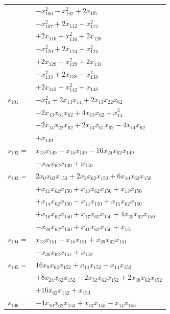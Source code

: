 \begin{longtable}{@{}r@{\;}l@{}}
 & \(\displaystyle -x_{100}^{2} -x_{102}^{2} +2x_{107}\) \\
 & \(\displaystyle -x_{107}^{2} +2x_{112} -x_{112}^{2}\) \\
 & \(\displaystyle +2x_{116} -x_{116}^{2} +2x_{120}\) \\
 & \(\displaystyle -x_{120}^{2} +2x_{124} -x_{124}^{2}\) \\
 & \(\displaystyle +2x_{129} -x_{129}^{2} +2x_{133}\) \\
 & \(\displaystyle -x_{133}^{2} +2x_{138} -x_{138}^{2}\) \\
 & \(\displaystyle +2x_{142} -x_{142}^{2} +x_{148}\) \\[3pt]
\(s_{101}=\) & \(\displaystyle -x_{13}^{2} +2x_{13}x_{14} +2x_{13}x_{22}x_{62}\) \\
 & \(\displaystyle -2x_{13}x_{61}x_{62} +4x_{13}x_{62} -x_{14}^{2}\) \\
 & \(\displaystyle -2x_{14}x_{22}x_{62} +2x_{14}x_{61}x_{62} -4x_{14}x_{62}\) \\
 & \(\displaystyle +x_{149}\) \\[3pt]
\(s_{102}=\) & \(\displaystyle x_{13}x_{149} -x_{14}x_{149} -16x_{24}x_{62}x_{149}\) \\
 & \(\displaystyle -x_{26}x_{62}x_{149} +x_{150}\) \\[3pt]
\(s_{103}=\) & \(\displaystyle 2x_{0}x_{62}x_{150} +2x_{2}x_{62}x_{150} +6x_{10}x_{62}x_{150}\) \\
 & \(\displaystyle +x_{11}x_{62}x_{150} +x_{13}x_{62}x_{150} +x_{13}x_{150}\) \\
 & \(\displaystyle +x_{14}x_{62}x_{150} -x_{14}x_{150} +x_{15}x_{62}x_{150}\) \\
 & \(\displaystyle +x_{16}x_{62}x_{150} +x_{17}x_{62}x_{150} +4x_{20}x_{62}x_{150}\) \\
 & \(\displaystyle -x_{28}x_{62}x_{150} +x_{41}x_{62}x_{150} +x_{151}\) \\[3pt]
\(s_{104}=\) & \(\displaystyle x_{13}x_{151} -x_{14}x_{151} +x_{26}x_{62}x_{151}\) \\
 & \(\displaystyle -x_{30}x_{62}x_{151} +x_{152}\) \\[3pt]
\(s_{105}=\) & \(\displaystyle 16x_{9}x_{62}x_{152} +x_{13}x_{152} -x_{14}x_{152}\) \\
 & \(\displaystyle +8x_{24}x_{62}x_{152} -2x_{32}x_{62}x_{152} +2x_{38}x_{62}x_{152}\) \\
 & \(\displaystyle +16x_{62}x_{152} +x_{153}\) \\[3pt]
\(s_{106}=\) & \(\displaystyle -4x_{10}x_{62}x_{153} +x_{13}x_{153} -x_{14}x_{153}\) \\

\end{longtable}
